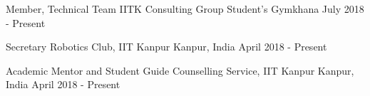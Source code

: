 \begin{cventries}

 \cventry
    {Member, Technical Team}
    {IITK Consulting Group}
    {Student's Gymkhana} 
    {July 2018 - Present}
    {}

  \cventry
    {Secretary}
    {Robotics Club, IIT Kanpur}
    {Kanpur, India} 
    {April 2018 - Present} 
    {}

  \cventry
    {Academic Mentor and Student Guide}
    {Counselling Service, IIT Kanpur}
    {Kanpur, India}
    {April 2018 - Present}
    {}

\end{cventries}
